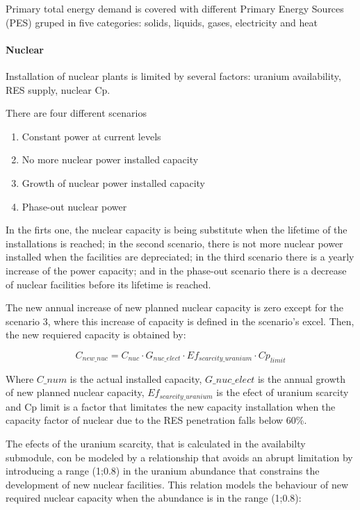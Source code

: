 Primary total energy demand is covered with different Primary Energy Sources (PES) gruped in five categories: solids, liquids, gases, electricity and heat

\paragraph{Nuclear}

Installation of nuclear plants is limited by several factors: uranium availability, RES supply, nuclear Cp.

There are four different scenarios
\begin{enumerate}
    \item Constant power at current levels
    \item No more nuclear power installed capacity
    \item Growth of nuclear power installed capacity
    \item Phase-out nuclear power
\end{enumerate}

In the firts one, the nuclear capacity is being substitute when the lifetime of the installations is reached; in the second scenario, there is not more nuclear power installed when the facilities are depreciated; in the third scenario there is a yearly increase of the power capacity; and in the phase-out scenario there is a decrease of nuclear facilities before its lifetime is reached.

The new annual increase of new planned nuclear capacity is zero except for the scenario 3, where this increase of capacity is defined in the scenario's excel. Then, the new requiered capacity is obtained by:

\begin{equation}
C_{new \_nuc}=   C_{nuc} \cdot G_{nuc\_elect} \cdot Ef_{scarcity\_uranium} \cdot Cp_{limit}
\label{eq:new-nuc-capacity}
\end{equation}

Where $C\_num$ is the actual installed capacity, $G\_nuc\_elect$ is the annual growth of new planned nuclear capacity, $Ef_{scarcity\_uranium}$ is the efect of uranium scarcity and Cp limit is a factor that limitates the new capacity installation when the capacity factor of nuclear due to the RES penetration falls below 60\%.

The efects of the uranium scarcity, that is calculated in the availabilty submodule, con be modeled by a relationship that avoids an abrupt limitation by introducing a range (1;0.8) in the uranium abundance that constrains the development of new nuclear facilities. This relation models the behaviour of new required nuclear capacity when the abundance is in the range (1;0.8):

